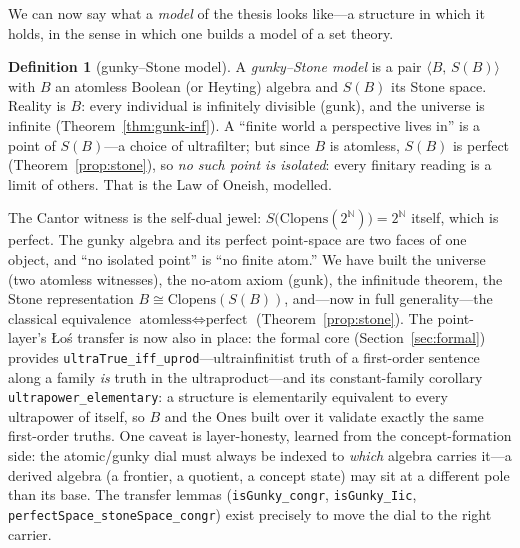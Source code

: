 \documentclass[]{article}
\theoremstyle{definition}
\newtheorem{definition}[theorem]{Definition}
\theoremstyle{remark}
\newcommand{\code}[1]{\texttt{#1}}
\newcommand{\N}{\mathbb{N}}
\begin{document}
We can now say what a \emph{model} of the thesis looks like---a structure in which it
holds, in the sense in which one builds a model of a set theory.

\begin{definition}[gunky--Stone model]
\label{def:model}
A \emph{gunky--Stone model} is a pair $\langle B,\,S(B)\rangle$ with $B$ an atomless
Boolean (or Heyting) algebra and $S(B)$ its Stone space. Reality is $B$: every
individual is infinitely divisible (gunk), and the universe is infinite
(Theorem~\ref{thm:gunk-inf}). A ``finite world a perspective lives in'' is a point of
$S(B)$---a choice of ultrafilter; but since $B$ is atomless, $S(B)$ is perfect
(Theorem~\ref{prop:stone}), so \emph{no such point is isolated}: every finitary
reading is a limit of others. That is the Law of Oneish, modelled.
\end{definition}

The Cantor witness is the self-dual jewel: $S\bigl(\mathrm{Clopens}(2^{\N})\bigr)=2^{\N}$
itself, which is perfect. The gunky algebra and its perfect point-space are two faces
of one object, and ``no isolated point'' is ``no finite atom.'' We have built the
universe (two atomless witnesses), the no-atom axiom (gunk), the infinitude theorem,
the Stone representation $B\cong\mathrm{Clopens}(S(B))$, and---now in full
generality---the classical equivalence $\text{atomless}\Leftrightarrow\text{perfect}$
(Theorem~\ref{prop:stone}). The point-layer's {\L}o\'s transfer is now also in place:
the formal core (Section~\ref{sec:formal}) provides
\code{ultraTrue\_iff\_uprod}---ultrainfinitist truth of a first-order sentence along a
family \emph{is} truth in the ultraproduct---and its constant-family corollary
\code{ultrapower\_elementary}: a structure is elementarily equivalent to every
ultrapower of itself, so $B$ and the Ones built over it validate exactly the same
first-order truths. One caveat is layer-honesty, learned from the concept-formation
side: the atomic/gunky dial must always be indexed to \emph{which} algebra carries
it---a derived algebra (a frontier, a quotient, a concept state) may sit at a
different pole than its base. The transfer lemmas (\code{isGunky\_congr},
\code{isGunky\_Iic}, \code{perfectSpace\_stoneSpace\_congr}) exist precisely to move
the dial to the right carrier.
\end{document}
